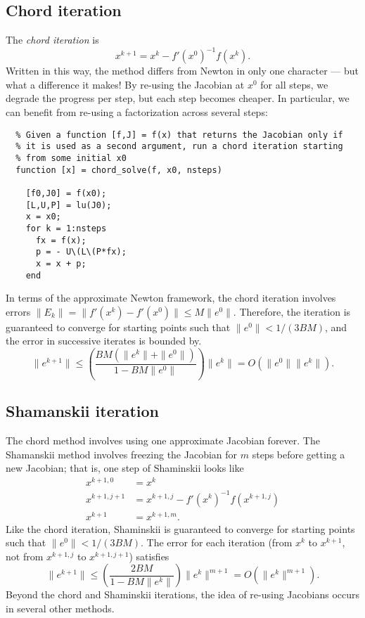\documentclass[12pt, leqno]{article} %
\begin{document}
\subsection{Chord iteration}

The {\em chord iteration} is
\[
  x^{k+1} = x^k - f'(x^0)^{-1} f(x^k).
\]
Written in this way, the method differs from Newton in only one
character --- but what a difference it makes!  By re-using the
Jacobian at $x^0$ for all steps, we degrade the progress per step, but
each step becomes cheaper.  In particular, we can benefit from
re-using a factorization across several steps:
\begin{lstlisting}
  % Given a function [f,J] = f(x) that returns the Jacobian only if
  % it is used as a second argument, run a chord iteration starting
  % from some initial x0
  function [x] = chord_solve(f, x0, nsteps)

    [f0,J0] = f(x0);
    [L,U,P] = lu(J0);
    x = x0;
    for k = 1:nsteps
      fx = f(x);
      p = - U\(L\(P*fx);
      x = x + p;
    end
\end{lstlisting}

In terms of the approximate Newton framework, the chord iteration
involves errors $\|E_k\| = \|f'(x^k)-f'(x^0)\| \leq M \|e^0\|$.
Therefore, the iteration is guaranteed to converge for starting
points such that $\|e^0\| < 1/(3BM)$, and the error in successive
iterates is bounded by.
\[
  \|e^{k+1}\| \leq \left( \frac{BM(\|e^k\| + \|e^0\|)}{1-BM\|e^0\|}
  \right) \|e^k\| = O(\|e^0\| \|e^k\|).
\]

\subsection{Shamanskii iteration}

The chord method involves using one approximate Jacobian forever.
The Shamanskii method involves freezing the Jacobian for $m$ steps
before getting a new Jacobian; that is, one step of Shaminskii looks
like
\begin{align*}
  x^{k+1,0} & = x^k \\
  x^{k+1,j+1} &= x^{k+1,j} - f'(x^k)^{-1} f(x^{k+1,j}) \\
  x^{k+1} &= x^{k+1,m}.
\end{align*}
Like the chord iteration, Shaminskii is guaranteed to converge for
starting points such that $\|e^0\| < 1/(3BM)$.  The error for
each iteration (from $x^k$ to $x^{k+1}$, not from $x^{k+1,j}$ to
$x^{k+1,j+1}$) satisfies
\[
  \|e^{k+1}\|
  \leq \left( \frac{2BM}{1-BM\|e^k\|} \right) \|e^{k}\|^{m+1}
  = O(\|e^k\|^{m+1}).
\]
Beyond the chord and Shaminskii iterations, the idea of re-using
Jacobians occurs in several other methods.
\end{document}
